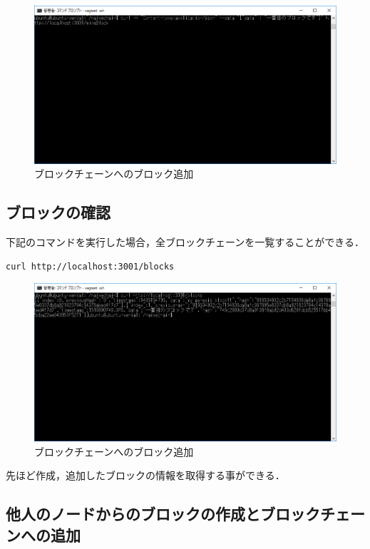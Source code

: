 \begin{figure}[h]
\centering
\includegraphics[width=12cm]{no1block.PNG}
\caption{ブロックチェーンへのブロック追加}\label{サンプル図}
\end{figure}

\newpage


\subsection{ブロックの確認}


下記のコマンドを実行した場合，全ブロックチェーンを一覧することができる．

\begin{verbatim}
curl http://localhost:3001/blocks
\end{verbatim}



\begin{figure}[h]
\centering
\includegraphics[width=12cm]{no1blockok.PNG}
\caption{ブロックチェーンへのブロック追加}\label{サンプル図}
\end{figure}

先ほど作成，追加したブロックの情報を取得する事ができる．



\newpage

\subsection{他人のノードからのブロックの作成とブロックチェーンへの追加}


